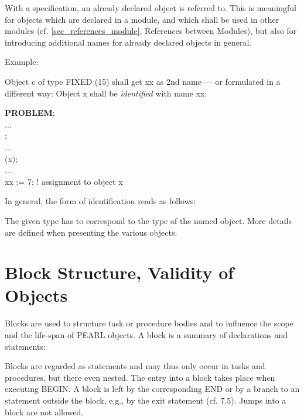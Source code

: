 With a specification, an already declared object is
referred to.  This is meaningful for objects which are declared in a
module, and which shall be used in other modules (cf. \ref{sec_references_module},
 References
between Modules), but also for introducing additional names for already
declared objects in general.

Example:

Object c of type FIXED (15) shall get xx as 2nd name --- or formulated
in a different way: Object x shall be {\it identified} with name xx:

{\bf PROBLEM};\\
\x ...\\
;\\
\x ...\\
 (x);\\
\x ...\\
\x xx := 7; \x ! assignment to object x

In general, the form of identification reads as follows:






The given type has to correspond to the type of the named object. More
details are defined when presenting the various objects.

\section{Block Structure, Validity of Objects}   %
\label{sec_block}

Blocks are used to structure task or procedure bodies and to influence
the scope and the life-span of PEARL objects. A block is a summary of
declarations and statements:



Blocks are regarded as statements and may thus only occur in tasks and
procedures, but there even nested. The entry into a block takes
place when executing BEGIN. A block is left by the corresponding END or
by a branch to an statement outside the block, e.g., by the exit
statement (cf. 7.5). Jumps into a block are not allowed.


